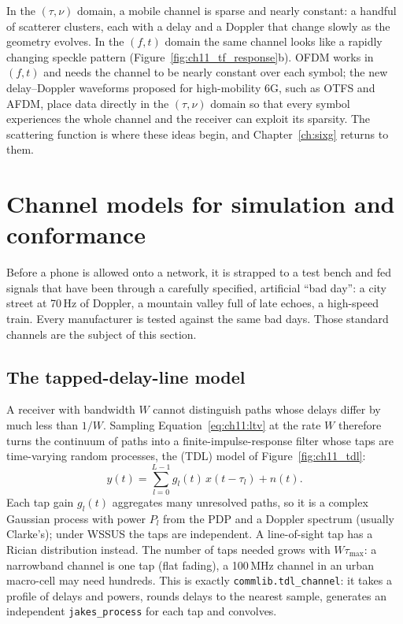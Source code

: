 \begin{keyidea}
In the $(\tau,\nu)$ domain, a mobile channel is sparse and nearly constant: a handful of scatterer
clusters, each with a delay and a Doppler that change slowly as the geometry evolves. In the
$(f,t)$ domain the same channel looks like a rapidly changing speckle pattern
(Figure~\ref{fig:ch11_tf_response}b). OFDM works in $(f,t)$ and needs the channel to be nearly
constant over each symbol; the new delay--Doppler waveforms proposed for high-mobility 6G, such as
OTFS and AFDM, place data directly in the $(\tau,\nu)$ domain so that every symbol experiences the whole
channel and the receiver can exploit its sparsity. The scattering function is where these ideas
begin, and Chapter~\ref{ch:sixg} returns to them.
\end{keyidea}

\section{Channel models for simulation and conformance}
\label{sec:ch11:standardmodels}

Before a phone is allowed onto a network, it is strapped to a test bench and fed signals that
have been through a carefully specified, artificial ``bad day'': a city street at 70\,Hz of
Doppler, a mountain valley full of late echoes, a high-speed train. Every manufacturer is tested
against the same bad days. Those standard channels are the subject of this section.

\subsection{The tapped-delay-line model}

A receiver with bandwidth $W$ cannot distinguish paths whose delays differ by much less than
$1/W$. Sampling Equation~\eqref{eq:ch11:ltv} at the rate $W$ therefore turns the continuum of paths
into a finite-impulse-response filter whose taps are time-varying random processes, the
 (TDL) model of Figure~\ref{fig:ch11_tdl}:
\begin{equation}
y(t)=\sum_{l=0}^{L-1}g_l(t)\,x(t-\tau_l)+n(t).
\end{equation}
Each tap gain $g_l(t)$ aggregates many unresolved paths, so it is a complex Gaussian process with
power $P_l$ from the PDP and a Doppler spectrum (usually Clarke's); under WSSUS the taps are
independent. A line-of-sight tap has a Rician distribution instead. The number of taps needed grows
with $W\tau_{\max}$: a narrowband channel is one tap (flat fading), a 100\,MHz channel in an urban
macro-cell may need hundreds. This is exactly \texttt{commlib.tdl\_channel}: it takes a profile of
delays and powers, rounds delays to the nearest sample, generates an independent
\texttt{jakes\_process} for each tap and convolves.

